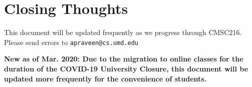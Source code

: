 \documentclass[english, 10pt]{article}
\begin{document}
\section{Closing Thoughts}

This document will be updated frequently as we progress through CMSC216. Please send errors to \texttt{apraveen@cs.umd.edu}\newline

\textbf{New as of Mar. 2020: Due to the migration to online classes for the duration of the COVID-19 University Closure, this document will be updated more frequently for the convenience of students.}
\end{document}
